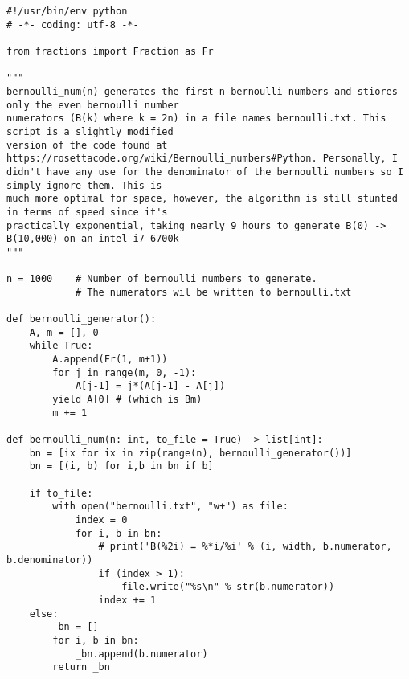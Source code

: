 \documentclass[11pt]{article}
\begin{document}
    \lstset{style=EddiePythonStyle}
    \begin{lstlisting}
#!/usr/bin/env python
# -*- coding: utf-8 -*-

from fractions import Fraction as Fr

"""
bernoulli_num(n) generates the first n bernoulli numbers and stiores only the even bernoulli number
numerators (B(k) where k = 2n) in a file names bernoulli.txt. This script is a slightly modified
version of the code found at https://rosettacode.org/wiki/Bernoulli_numbers#Python. Personally, I
didn't have any use for the denominator of the bernoulli numbers so I simply ignore them. This is
much more optimal for space, however, the algorithm is still stunted in terms of speed since it's
practically exponential, taking nearly 9 hours to generate B(0) -> B(10,000) on an intel i7-6700k
"""

n = 1000    # Number of bernoulli numbers to generate.
            # The numerators wil be written to bernoulli.txt

def bernoulli_generator():
    A, m = [], 0
    while True:
        A.append(Fr(1, m+1))
        for j in range(m, 0, -1):
            A[j-1] = j*(A[j-1] - A[j])
        yield A[0] # (which is Bm)
        m += 1

def bernoulli_num(n: int, to_file = True) -> list[int]:
    bn = [ix for ix in zip(range(n), bernoulli_generator())]
    bn = [(i, b) for i,b in bn if b]

    if to_file:
        with open("bernoulli.txt", "w+") as file:
            index = 0
            for i, b in bn:
                # print('B(%2i) = %*i/%i' % (i, width, b.numerator, b.denominator))
                if (index > 1):
                    file.write("%s\n" % str(b.numerator))
                index += 1
    else:
        _bn = []
        for i, b in bn:
            _bn.append(b.numerator)
        return _bn
    \end{lstlisting}
\end{document}
